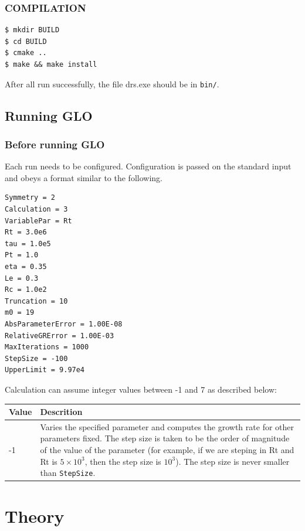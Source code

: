 \documentclass[a4paper,10pt]{book}
\begin{document}
\subsection{COMPILATION}
\begin{verbatim}
$ mkdir BUILD
$ cd BUILD
$ cmake ..
$ make && make install
\end{verbatim}
After all run successfully, the file drs.exe should be in \verb|bin/|.

\section{Running GLO}
\subsection{Before running GLO}
\label{s:runConfig}
Each run needs to be configured. Configuration is passed on the standard input
and obeys a format similar to the following.
\begin{tiny}
\begin{verbatim}
Symmetry = 2
Calculation = 3
VariablePar = Rt
Rt = 3.0e6 
tau = 1.0e5 
Pt = 1.0 
eta = 0.35 
Le = 0.3 
Rc = 1.0e2
Truncation = 10 
m0 = 19
AbsParameterError = 1.00E-08 
RelativeGRError = 1.00E-03 
MaxIterations = 1000
StepSize = -100 
UpperLimit = 9.97e4
\end{verbatim}
\end{tiny}

Calculation can assume integer values between -1 and 7 as described below:

\begin{tabular}{| m{} | p{}|}
Value & Descrition \\ \hline
-1  &  {Varies the specified parameter and computes the growth rate for 
other parameters fixed. The step size is taken to be the order of magnitude 
of the value of the parameter (for example, if we are steping in Rt and Rt 
is $5\times10^3$, then the step size is $10^3$). The step size is never 
smaller than \verb|StepSize|.}\\
\end{tabular}

\chapter{Theory}
\end{document}
